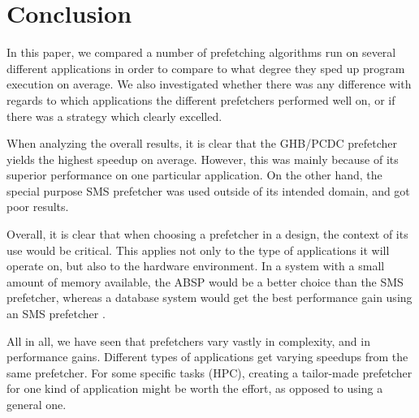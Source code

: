 
\section{Conclusion}
\label{sec:conclusion}

In this paper, we compared a number of prefetching algorithms run on
several different applications in order to compare to what degree they
sped up program execution on average. We also investigated whether
there was any difference with regards to which applications the
different prefetchers performed well on, or if there was a strategy
which clearly excelled.

When analyzing the overall results, it is clear that the GHB/PCDC prefetcher yields the highest speedup on average. However, this was mainly because of its superior performance on one particular application. On the other hand, the special purpose SMS prefetcher was used outside of its intended domain, and got poor results.  

Overall, it is clear that when choosing a prefetcher in a design, the context of its use would be critical. This applies not only to the type of applications it will operate on, but also to the hardware environment. In a system with a small amount of memory available, the ABSP would be a better choice than the SMS prefetcher, whereas a database system would get the best performance gain using an SMS prefetcher \cite{SMS}. 

All in all, we have seen that prefetchers vary vastly in complexity, and in performance gains. Different types of applications get varying speedups from the same prefetcher. For some specific tasks (HPC), creating a tailor-made prefetcher for one kind of application might be worth the effort, as opposed to using a general one.
